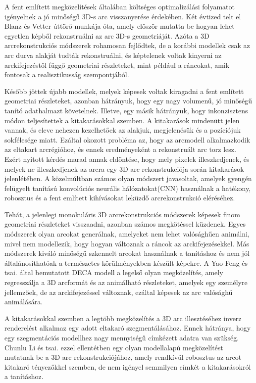\documentclass[12pt,a4]{article}
\begin{document}
        A fent említett megközelítések általában költséges optimalizálási folyamatot igényelnek a jó minőségű 3D-s arc visszanyerése érdekében. Két évtized telt el Blanz és Vetter \cite{blanzvetter} úttörő munkája óta, amely először mutatta be hogyan lehet egyetlen képből rekonstruálni az arc 3D-s geometriáját. Azóta a 3D arcrekonstrukciós módszerek rohamosan fejlődtek, de a korábbi modellek csak az arc durva alakját tudták rekonstruálni, és képtelenek voltak kinyerni az arckifejezéstől függő geometriai részleteket, mint például a ráncokat, amik fontosak a realisztikusság szempontjából.

        Később jöttek újabb modellek, melyek képesek voltak kiragadni a fent említett geometriai részleteket, azonban hátrányuk, hogy egy nagy volumenű, jó minőségű tanító adathalmazt követelnek. Illetve, egy másik hátrányuk, hogy inkonzisztens módon teljesítettek a kitakarásokkal szemben. A kitakarások mindenütt jelen vannak, és eleve nehezen kezelhetőek az alakjuk, megjelenésük és a pozíciójuk sokfélesége miatt. Ezáltal okozott probléma az, hogy az arcmodell alkalmazkodik az eltakart arcrégióhoz, és ennek eredményeként a rekonstruált arc torz lesz. Ezért nyitott kérdés marad annak eldöntése, hogy mely pixelek illeszkedjenek, és melyek ne illeszkedjenek az arcra egy 3D arc rekonstrukciója során kitakarások jelenlétében. A közelmúltban számos olyan módszert javasoltak, amelyek gyengén felügyelt tanítású konvolúciós neurális hálózatokat(CNN) használnak a hatékony, robosztus és a fent említett kihívásokat leküzdő arcrekonstrukció eléréséhez.

        Tehát, a jelenlegi monokuláris 3D arcrekonstrukciós módszerek képesek finom geometriai részleteket visszaadni, azonban számos megkötéssel küzdenek. Egyes módszerek olyan arcokat generálnak, amelyeket nem lehet valósághűen animálni, mivel nem modellezik, hogy hogyan változnak a ráncok az arckifejezésekkel. Más módszerek kiváló minőségű szkennelt arcokat használnak a tanításhoz és nem jól általánosíthatóak a természetes körülményekben készült képekre. A Yao Feng és tsai. \cite{deca} által bemutatott DECA modell a legelső olyan megközelítés, amely regresszálja a 3D arcformát és az animálható részleteket, amelyek egy személyre jellemzőek, de az arckifejezéssel változnak, ezáltal képesek az arc valósághű animálására.

        A kitakarásokkal szemben a legtöbb megközelítés a 3D arc illesztéséhez inverz renderelést alkalmaz egy adott eltakaró szegmentálásához. Ennek hátránya, hogy egy szegmentációs modellhez nagy mennyiségű címkézett adatra van szükség. Chunlu Li és tsai. \cite{focus} ezzel ellentétben egy olyan modellalapú megközelítést mutatnak be a 3D arc rekonstrukciójához, amely rendkívül robosztus az arcot kitakaró tényezőkkel szemben, de nem igényel semmilyen címkét a kitakarásokról a tanításhoz.
\end{document}
